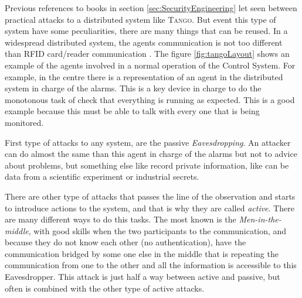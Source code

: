 \documentclass[10pt,a4paper,twoside]{llncs}
\newcommand{\ok}[1]{``#1'' [\texttt{\color{green}OK}]}
\newcommand{\tango}{\textsc{Tango}}
\begin{document}

Previous references to books in section \ref{sec:SecurityEngineering} let seen between practical attacks to a distributed system like \tango. But event this type of system have some peculiarities, there are many things that can be reused. In a widespread distributed system, the agents communication is not too different than RFID card/reader communication \cite{Santi11}. The figure \ref{fig:tangoLayout} shows an example of the agents involved in a normal operation of the Control System. For example, in the centre there is a representation of an agent in the distributed system in charge of the alarms. This is a key device in charge to do the monotonous task of check that everything is running as expected. This is a good example because this must be able to talk with every one that is being monitored.

First type of attacks to any system, are the passive \emph{Eavesdropping}. An attacker can do almost the same than this agent in charge of the alarms but not to advice about problems, but something else like record private information, like can be data from a scientific experiment or industrial secrets.

There are other type of attacks that passes the line of the observation and starts to introduce actions to the system, and that is why they are called \emph{active}. There are many different ways to do this tasks. The most known is the \emph{Men-in-the-middle}, with good skills when the two participants to the communication, and because they do not know each other (no authentication), have the communication bridged by some one else in the middle that is repeating the communication from one to the other and all the information is accessible to this Eavesdropper. This attack is just half a way between active and passive, but often is combined with the other type of active attacks.
\end{document}
